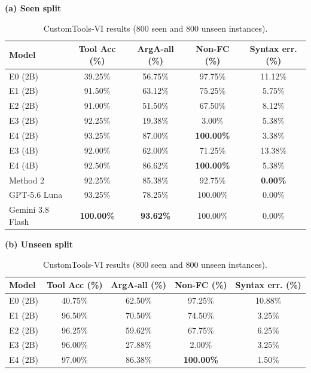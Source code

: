 \documentclass[10pt,twocolumn,a4paper]{article}
\newcommand{\tabletext}{\small}
\begin{document}
\begin{table}[htbp]
    \centering
    \caption{CustomTools-VI results (800 seen and 800 unseen instances).}
    \label{tab:custom-results}
    \tabletext
    \textbf{(a) Seen split}\\[2pt]
    \begin{tabular*}{\textwidth}{@{\extracolsep{\fill}}lcccc@{}}
        \toprule
        \textbf{Model} & \textbf{Tool Acc (\%)} & \textbf{ArgA-all (\%)} & \textbf{Non-FC (\%)} & \textbf{Syntax err. (\%)} \\
        \midrule
        E0 (2B) & 39.25\% & 56.75\% & 97.75\% & 11.12\% \\
        E1 (2B) & 91.50\% & 63.12\% & 75.25\% & 5.75\% \\
        E2 (2B) & 91.00\% & 51.50\% & 67.50\% & 8.12\% \\
        E3 (2B) & 92.25\% & 19.38\% & 3.00\% & 5.38\% \\
        E4 (2B) & 93.25\% & 87.00\% & \textbf{100.00\%} & 3.38\% \\
        E3 (4B) & 92.00\% & 62.00\% & 71.25\% & 13.38\% \\
        E4 (4B) & 92.50\% & 86.62\% & \textbf{100.00\%} & 5.38\% \\
        Method 2 & 92.25\% & 85.38\% & 92.75\% & \textbf{0.00\%} \\
        GPT-5.6 Luna & 93.25\% & 78.25\% & 100.00\% & 0.00\% \\
        Gemini 3.8 Flash & \textbf{100.00\%} & \textbf{93.62\%} & 100.00\% & 0.00\% \\
        \bottomrule
    \end{tabular*}
    \par\medskip
    \textbf{(b) Unseen split}\\[2pt]
    \begin{tabular*}{\textwidth}{@{\extracolsep{\fill}}lcccc@{}}
        \toprule
        \textbf{Model} & \textbf{Tool Acc (\%)} & \textbf{ArgA-all (\%)} & \textbf{Non-FC (\%)} & \textbf{Syntax err. (\%)} \\
        \midrule
        E0 (2B) & 40.75\% & 62.50\% & 97.25\% & 10.88\% \\
        E1 (2B) & 96.50\% & 70.50\% & 74.50\% & 3.25\% \\
        E2 (2B) & 96.25\% & 59.62\% & 67.75\% & 6.25\% \\
        E3 (2B) & 96.00\% & 27.88\% & 2.00\% & 3.25\% \\
        E4 (2B) & 97.00\% & 86.38\% & \textbf{100.00\%} & 1.50\% \\

\end{tabular*}
\end{table}
\end{document}
